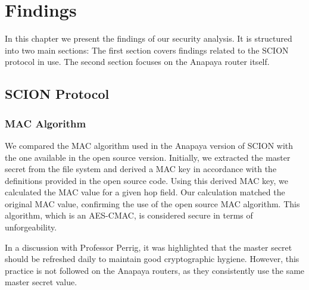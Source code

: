 \chapter{Findings}
\label{ch:findings}


In this chapter we present the findings of our security analysis.
It is structured into two main sections:
The first section covers findings related to the SCION protocol in use.
The second section focuses on the Anapaya router itself.


\section{SCION Protocol}



\subsection{MAC Algorithm}
We compared the MAC algorithm used in the Anapaya version of SCION with the one available in the open source version.
Initially, we extracted the master secret from the file system and derived a MAC key in accordance with the definitions provided in the open source code.
Using this derived MAC key, we calculated the MAC value for a given hop field.
Our calculation matched the original MAC value, confirming the use of the open source MAC algorithm.
This algorithm, which is an AES-CMAC, is considered secure in terms of unforgeability.

In a discussion with Professor Perrig, it was highlighted that the master secret should be refreshed daily to maintain good cryptographic hygiene.
However, this practice is not followed on the Anapaya routers, as they consistently use the same master secret value.

